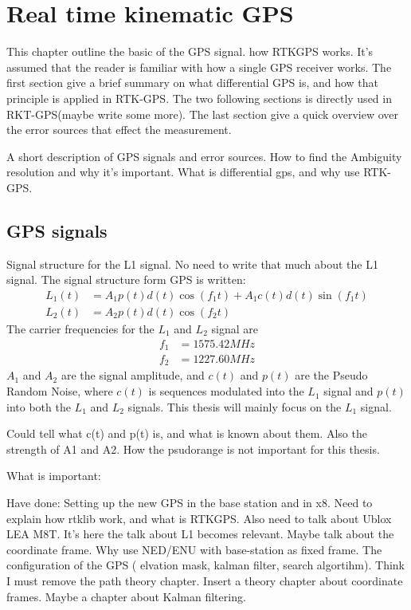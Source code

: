 
\chapter{Real time kinematic GPS}
This chapter outline the basic of the GPS signal. how RTKGPS works. It's assumed that the reader is familiar with how a single GPS receiver works. The first section give a brief summary on what differential GPS is, and how that principle is applied in RTK-GPS. The two following sections is directly used in RKT-GPS(maybe write some more). The last section give a quick overview over the error sources that effect the measurement.

A short description of GPS signals and error sources. How to find the Ambiguity resolution and why it's important. What is differential gps, and why use RTK-GPS.


\section{GPS signals}
Signal structure for the L1 signal. No need to write that much about the L1 signal.
The signal structure form GPS is written:
\begin{align*}
L_1(t) &= A_1p(t)d(t)\cos(f_1t) + A_1c(t)d(t)\sin(f_1t) \\
L_2(t) &= A_2p(t)d(t)\cos(f_2t)
\end{align*}
The carrier frequencies for the $L_1$ and $ L_2$ signal are
\begin{align*}
f_1 &= 1575.42 MHz \\
f_2 &= 1227.60 MHz
\end{align*}
$A_1$ and $A_2$ are the signal amplitude, and $c(t)$ and $p(t)$ are the Pseudo Random Noise, where $c(t)$ is sequences modulated into the $L_1$ signal and $p(t)$ into both the $L_1$ and $L_2$ signals. This thesis will mainly focus on the $L_1$ signal.

Could tell what c(t) and p(t) is, and what is known about them. Also the strength of A1 and A2. How the psudorange is not important for this thesis.

What is important:

Have done: Setting up the new GPS in the base station and in x8. Need to explain how rtklib work, and what is RTKGPS. Also need to talk about Ublox LEA M8T. It's here the talk about L1 becomes relevant. Maybe talk about the coordinate frame. Why use NED/ENU with base-station as fixed frame. The configuration of the GPS ( elvation mask, kalman filter, search algortihm). Think I must remove the path theory chapter. Insert a theory chapter about coordinate frames. Maybe a chapter about Kalman filtering.
